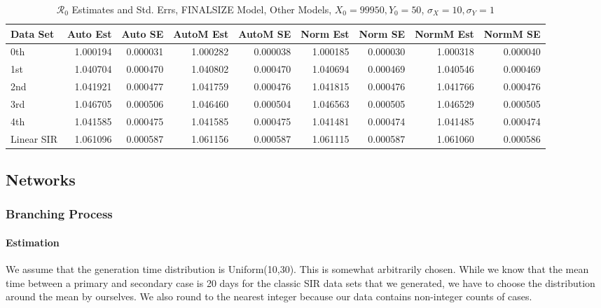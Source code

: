 \documentclass[12pt]{article}
\newcommand{\rr}{\ensuremath{\mathcal{R}_0}}
\begin{document}
\begin{table}[H]
	
	\caption{$\rr$ Estimates and Std. Errs, FINALSIZE Model,
		Other Models, $X_0 = 99950, Y_0 = 50$, 
		$\sigma_X = 10, \sigma_Y = 1$}
	\begin{footnotesize}
		\hskip -1cm
		\begin{tabular}{l|r|r|r|r|r|r|r|r}
			\hline
			Data Set & Auto Est & Auto SE & AutoM Est & AutoM SE & Norm Est & Norm SE & NormM Est & NormM SE\\
			\hline
			0th & 1.000194 & 0.000031 & 1.000282 & 0.000038 & 1.000185 & 0.000030 & 1.000318 & 0.000040\\
			\hline
			1st & 1.040704 & 0.000470 & 1.040802 & 0.000470 & 1.040694 & 0.000469 & 1.040546 & 0.000469\\
			\hline
			2nd & 1.041921 & 0.000477 & 1.041759 & 0.000476 & 1.041815 & 0.000476 & 1.041766 & 0.000476\\
			\hline
			3rd & 1.046705 & 0.000506 & 1.046460 & 0.000504 & 1.046563 & 0.000505 & 1.046529 & 0.000505\\
			\hline
			4th & 1.041585 & 0.000475 & 1.041585 & 0.000475 & 1.041481 & 0.000474 & 1.041485 & 0.000474\\
			\hline
			Linear SIR & 1.061096 & 0.000587 & 1.061156 & 0.000587 & 1.061115 & 0.000587 & 1.061060 & 0.000586\\
			\hline
		\end{tabular}
	\end{footnotesize}
\end{table}

\subsection{Networks}

\subsubsection{Branching Process}

\paragraph{Estimation}

We assume that the generation time distribution is Uniform(10,30). This is somewhat arbitrarily chosen. While we know that the mean time between a primary and secondary case is 20 days for the classic SIR data sets that we generated, we have to choose the distribution around the mean by ourselves. We also round to the nearest integer because our data contains non-integer counts of cases.
\end{document}
